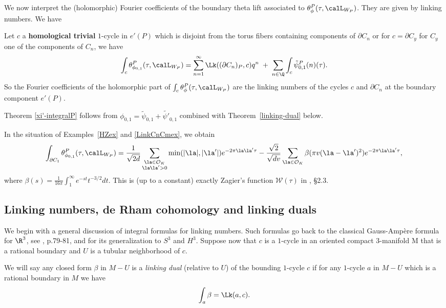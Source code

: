 We now interpret the (holomorphic) Fourier coefficients of the
boundary theta lift associated to $ \theta^P_{\phi}(\tau,\calL_{W_P})$.
They are given by linking numbers. We have


\begin{theorem}\label{xi'-integralP}
Let $c$ a \textbf{homological trivial} $1$-cycle in $e'(P)$ which
is disjoint from the torus fibers containing components of $\partial
C_n$ or for $c=\partial C_y$ for $C_y$ one of the components of
$C_n$, we have
\[
\int_{c} \theta^P_{\phi_{0,1}}(\tau,\calL_{W_P}) = 
  \sum_{n=1}^{\infty}  \Lk((\partial C_n)_P,c) q^n
 \; + \; \sum_{n \in \Q} \int_{c}  {\tilde{\psi}_{0,1}^P}(n)(\tau).
\]
 So the Fourier coefficients of the holomorphic part of $\int_{c} \theta^P_{\phi}(\tau,\calL_{W_P})$ are the linking numbers of the cycles $c$ and $ \partial C_n$ at the boundary component $e'(P)$.  
 \end{theorem}

Theorem \ref{xi'-integralP} follows from $\phi_{0,1} = \tilde{\psi}_{0,1} + \tilde{\psi'}_{0,1}$ combined with Theorem~\ref{linking-dual} below.  

\begin{example}\label{HZbeta}
In the situation of Examples~\ref{HZex} and \ref{LinkCnCmex}, we obtain
\[
\int_{\partial C_1} \theta^P_{\phi_{0,1}}(\tau,\calL_{W_P}) = \frac{1}{\sqrt{2d}} \sum_{\substack{\la \in \mathcal{O}_K \\ \la\la'>0}} \min(|\la|,|\la'|) e^{-2\pi \la \la' \tau } - \frac{\sqrt{2}}{\sqrt{dv}} \sum_{\la \in \mathcal{O}_K} \beta (\pi v (\la-\la')^2) e^{-2\pi \la \la' \tau},
\]
where $\beta(s) = \tfrac1{16\pi} \int_1^{\infty} e^{-st}t^{-3/2} dt$. This is (up to a constant) exactly Zagier's function $\mathcal{W}(\tau)$ in \cite{HZ}, \S 2.3. 


\end{example}

\subsection{Linking numbers, de Rham cohomology and linking duals} \label{generallinking}
We begin with a general discussion of integral formulas for linking numbers.
Such formulas go back to the classical Gauss-Amp\`ere formula for
$\R^3$, see \cite{F}, p.79-81, and \cite{DG} for its generalization
to $S^3$ and $H^3$.
Suppose now that $c$ is a $1$-cycle in an oriented compact $3$-manifold
M that is a rational boundary and $U$ is a tubular neighborhood of
$c$.
\begin{definition}
We will say any closed form $\beta$ in $M-U$ is a {\it linking dual}
(relative to $U$) of the bounding $1$-cycle $c$ if for any $1$-cycle
$a$ in $M-U$
which is a rational boundary in $M$ we have
\begin{equation*} \label{linkingdualdef} 
\int_a \beta = \Lk(a,c).
\end{equation*}
\end{definition}

